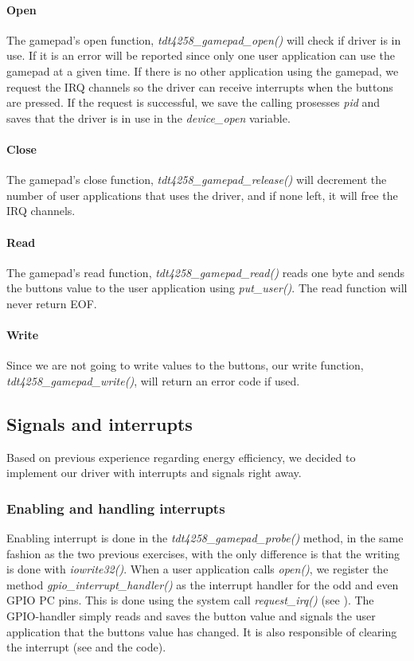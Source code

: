 \paragraph{Open} The gamepad's open function, \emph{tdt4258\_gamepad\_open()} will check if driver is in use. If it is an error will be reported since only one user application can use the gamepad at a given time. If there is no other application using the gamepad, we request the IRQ channels so the driver can receive interrupts when the buttons are pressed. If the request is successful, we save the calling prosesses \emph{pid} and saves that the driver is in use in the \emph{device\_open} variable.    

\paragraph{Close} The gamepad's close function, \emph{tdt4258\_gamepad\_release()} will decrement the number of user applications that uses the driver, and if none left, it will free the IRQ channels.

\paragraph{Read} The gamepad's read function, \emph{tdt4258\_gamepad\_read()} reads one byte and sends the buttons value to the user application using \emph{put\_user()}. The read function will never return EOF.

\paragraph{Write} Since we are not going to write values to the buttons, our write function, \emph{tdt4258\_gamepad\_write()}, will return an error code if used.

\subsection{Signals and interrupts}
\label{subsection:signals-and-interrupts}
Based on previous experience regarding energy efficiency, we decided to implement our driver with interrupts and signals right away.
\subsubsection{Enabling and handling interrupts}

Enabling interrupt is done in the \emph{tdt4258\_gamepad\_probe()} method, in the same fashion as the two previous exercises, with the only difference is that the writing is done with \emph{iowrite32()}. When a user application calls \emph{open()}, we register the method \emph{gpio\_interrupt\_handler()} as the interrupt handler for the odd and even GPIO PC pins. This is done using the system call \emph{request\_irq()} (see \cite{interrupt_handler}). The GPIO-handler simply reads and saves the button value and signals the user application that the buttons value has changed. It is also responsible of clearing the interrupt (see \cite[section 3]{compendium} and the code).   

